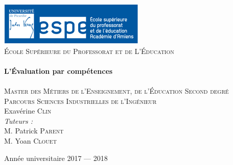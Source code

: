 \begin{titlepage}
  \begin{sffamily}
  \begin{center}

    \includegraphics[scale=0.8]{./images/logo_espe}~\\[1cm]
    \textsc{\LARGE École Supérieure du Professorat et de L'Éducation}\\[1.5cm]

    \HRule \\[0.4cm]
    { \huge \bfseries L'Évaluation par compétences\\[0.4cm] }
    \HRule \\[2cm]


    \textsc{\Large Master des Métiers de l'Enseignement, de l'Éducation Second degré}\\[1.5cm]
    \textsc{\Large Parcours Sciences Industrielles de l'Ingénieur}\\[1.5cm]


        Exavérine \textsc{Clin}\\
\vspace{1em}
        \emph{Tuteurs :} \\
        M. Patrick \textsc{Parent}\\
        M. Yoan \textsc{Clouet}



    \vfill

    {\large Année universitaire 2017 — 2018}

  \end{center}
  \end{sffamily}
\end{titlepage}

